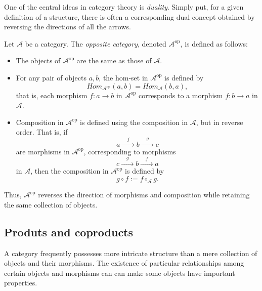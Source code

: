 One of the central ideas in category theory is \emph{duality}. Simply put, for a given definition of a structure, there is often a corresponding dual concept obtained by reversing the directions of all the arrows. 

\begin{definition} 
Let \(\mathcal{A}\) be a category. The \emph{opposite category}, denoted \(\mathcal{A}^{\mathrm{op}}\), is defined as follows:
\begin{itemize}
  \item The objects of \(\mathcal{A}^{\mathrm{op}}\) are the same as those of \(\mathcal{A}\).
  \item For any pair of objects \(a, b\), the hom-set in \(\mathcal{A}^{\mathrm{op}}\) is defined by
  \[
  \textit{Hom}_{\mathcal{A}^{\mathrm{op}}}(a, b) = \textit{Hom}_{\mathcal{A}}(b, a),
  \]
  that is, each morphism \(f: a \to b\) in \(\mathcal{A}^{\mathrm{op}}\) corresponds to a morphism \(f: b \to a\) in \(\mathcal{A}\).
  \item Composition in \(\mathcal{A}^{\mathrm{op}}\) is defined using the composition in \(\mathcal{A}\), but in reverse order. That is, if
  \[
  a \xrightarrow{ \quad f \quad } b \xrightarrow{\quad g \quad } c
  \]
  are morphisms in \(\mathcal{A}^{\mathrm{op}}\), corresponding to morphisms
  \[
  c \xrightarrow{ \quad g \quad} b \xrightarrow{ \quad f \quad} a
  \]
  in \(\mathcal{A}\), then the composition in \(\mathcal{A}^{\mathrm{op}}\) is defined by
  \[
  g \circ f := f \circ_{\mathcal{A}} g.
  \]
\end{itemize}

Thus, \(\mathcal{A}^{\mathrm{op}}\) reverses the direction of morphisms and composition while retaining the same collection of objects.
\end{definition}






\subsection{Produts and coproducts}

 A category frequently possesses more intricate structure than a mere collection of objects and their morphisms. The existence of particular relationships among certain objects and morphisms can can make some objects have important properties.

